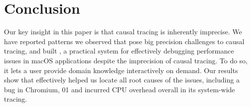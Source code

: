 \section{Conclusion} \label{sec:conclusion}
Our key insight in this paper is that causal tracing is inherently
imprecise. We have reported patterns we observed that pose big precision
challenges to causal tracing, and built \xxx, a practical system for
effectively debugging performance issues in macOS applications despite the
imprecision of causal tracing.  To do so, it lets a user provide domain
knowledge interactively on demand. Our results show that \xxx effectively
helped us locate all root causes of the issues, including a bug in Chromium,
01 and incurred \cpuoverhead CPU overhead overall in its system-wide tracing.
\clearpage
